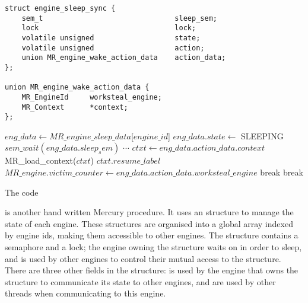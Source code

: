 \begin{algorithm}[tbp]
\begin{minipage}{\textwidth}
\begin{verbatim}
struct engine_sleep_sync {
    sem_t                               sleep_sem;
    lock                                lock;
    volatile unsigned                   state;
    volatile unsigned                   action;
    union MR_engine_wake_action_data    action_data;
};

union MR_engine_wake_action_data {      
    MR_EngineId     worksteal_engine;
    MR_Context      *context;
};
\end{verbatim}

\begin{algorithmic}
        \Loop
            \State $eng\_data \gets MR\_engine\_sleep\_data$[$engine\_id$]
            \State $eng\_data.state \gets$ SLEEPING
            \State $sem\_wait(eng\_data.sleep_sem)$
                \State $\cdots$
              \EndCase
                \State $ctxt \gets eng\_data.action\_data.context$
                \State MR\_load\_context($ctxt$)
                \Goto $ctxt.resume\_label$
              \EndCase
                \State $MR\_engine.victim\_counter \gets
                    eng\_data.action\_data.worksteal\_engine$ 
                \State {}
                \State {}
                \State break
              \EndCase
                \State {}
                \State {}
                \State break
              \EndCase
            \EndSwitch
        \EndLoop
    \EndProcedure
\end{algorithmic}

\end{minipage}
\caption{The \sleep code}
\end{algorithm}

\sleep is another hand written Mercury procedure.
It uses an
\enginesleepsync structure to manage the state of each engine.
These structures are organised into a global array indexed by engine ids,
making them accessible to other engines.
The structure contains a semaphore and a lock;
the engine owning the structure waits on  in order to
sleep,
and  is used by other engines to control their mutual
access to the \enginesleepsync structure.
There are three other fields in the structure:
 is used by the engine that owns the structure to communicate
its state to other engines,
 and  are used by other threads when
communicating to this engine.

